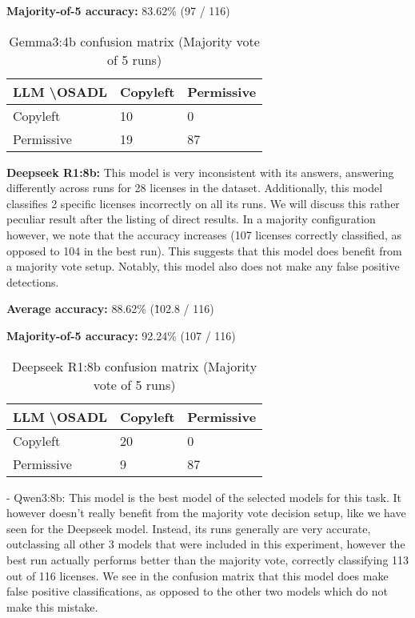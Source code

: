 \textbf{Majority-of-5 accuracy:} 83.62\% (97 / 116)

\begin{table}[h]
	\caption{Gemma3:4b confusion matrix (Majority vote of 5 runs)}
	\label{tab:gemma3-confmatrix}
	\centering
	\begin{tabular}{l|ll}
		\hline
		\textbf{LLM \textbackslash OSADL} & Copyleft & Permissive \\ \hline
		Copyleft & 10 & 0 \\
		Permissive & 19 & 87 \\\hline
	\end{tabular}
\end{table}

\textbf{Deepseek R1:8b:} This model is very inconsistent with its answers, answering differently across runs for 28 licenses in the dataset. Additionally, this model classifies 2 specific licenses incorrectly on all its runs. We will discuss this rather peculiar result after the listing of direct results. In a majority configuration however, we note that the accuracy increases (107 licenses correctly classified, as opposed to 104 in the best run). This suggests that this model does benefit from a majority vote setup. Notably, this model also does not make any false positive detections.

\textbf{Average accuracy:} 88.62\% (\~ 102.8 / 116)

\textbf{Majority-of-5 accuracy:} 92.24\% (107 / 116)

\begin{table}[h]
	\caption{Deepseek R1:8b confusion matrix (Majority vote of 5 runs)}
	\label{tab:deepseekr1-confmatrix}
	\centering
	\begin{tabular}{l|ll}
		\hline
		\textbf{LLM \textbackslash OSADL} & Copyleft & Permissive \\ \hline
		Copyleft & 20 & 0 \\
		Permissive & 9 & 87 \\\hline
	\end{tabular}
\end{table}

- Qwen3:8b: This model is the best model of the selected models for this task. It however doesn't really benefit from the majority vote decision setup, like we have seen for the Deepseek model. Instead, its runs generally are very accurate, outclassing all other 3 models that were included in this experiment, however the best run actually performs better than the majority vote, correctly classifying 113 out of 116 licenses. We see in the confusion matrix that this model does make false positive classifications, as opposed to the other two models which do not make this mistake.


